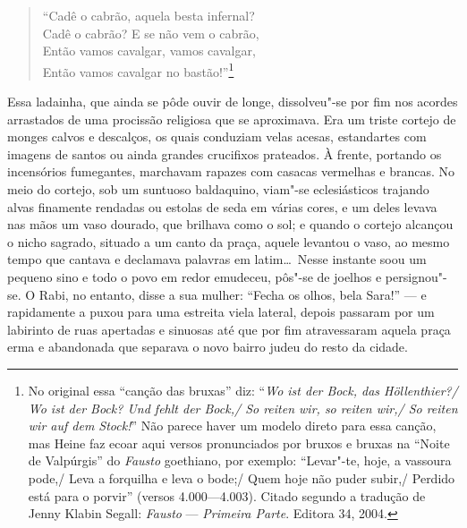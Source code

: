 \begin{verse}
``Cadê o cabrão, aquela besta infernal?\\
Cadê o cabrão? E se não vem o cabrão,\\
Então vamos cavalgar, vamos cavalgar,\\
Então vamos cavalgar no bastão!''\footnote{ No
original essa ``canção das bruxas'' diz: ``\textit{{Wo ist der Bock, das
Höllenthier?/ Wo ist der Bock? Und fehlt der Bock,/ So reiten
wir, so reiten wir,/ So reiten wir auf dem Stock!}}'' Não parece haver um
modelo direto para essa canção, mas Heine faz ecoar aqui versos
pronunciados por bruxos e bruxas na ``Noite de Valpúrgis'' do
\textit{Fausto} goethiano, por exemplo: ``Levar"-te, hoje, a vassoura
pode,/ Leva a forquilha e leva o bode;/ Quem hoje não puder subir,/
Perdido está para o porvir'' (versos 4.000---4.003). Citado segundo a
tradução de Jenny Klabin Segall: \textit{Fausto }--- \textit{Primeira
Parte}. Editora 34, 2004.}
\end{verse}

Essa ladainha, que ainda se pôde ouvir de longe, dissolveu"-se por fim
nos acordes arrastados de uma procissão religiosa que se aproximava.
Era um triste cortejo de monges calvos e descalços, os quais conduziam
velas acesas, estandartes com imagens de santos ou ainda grandes
crucifixos prateados. À frente, portando os incensórios fumegantes,
marchavam rapazes com casacas vermelhas e brancas. No meio do cortejo,
sob um suntuoso baldaquino, viam"-se eclesiásticos trajando alvas
finamente rendadas ou estolas de seda em várias cores, e um deles
levava nas mãos um vaso dourado, que brilhava como o sol; e quando o
cortejo alcançou o nicho sagrado, situado a um canto da praça, aquele
levantou o vaso, ao mesmo tempo que cantava e declamava palavras em
latim\ldots\ Nesse instante soou um pequeno sino e todo o povo em redor
emudeceu, pôs"-se de joelhos e persignou"-se. O Rabi, no entanto,
disse a sua mulher: ``Fecha os olhos, bela Sara!'' --- e rapidamente a
puxou para uma estreita viela lateral, depois passaram por um labirinto
de ruas apertadas e sinuosas até que por fim atravessaram aquela praça
erma e abandonada que separava o novo bairro judeu do resto da cidade.

